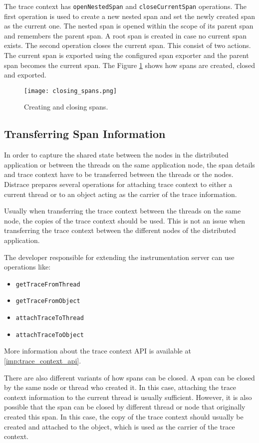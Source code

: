 The trace context has \texttt{openNestedSpan} and \texttt{closeCurrentSpan} operations. The first operation is used to create a new nested span and set the newly created span as the current one. The nested span is opened within the scope of its parent span and remembers the parent span. A root span is created in case no current span exists. The second operation closes the current span. This consist of two actions. The current span is exported using the configured span exporter and the parent span becomes the current span. The Figure \ref{fig:closing_spans} shows how spans are created, closed and exported. \begin{figure}
	\centering
	\texttt{[image: closing\_spans.png]}
	\caption{Creating and closing spans.}
	\label{fig:closing_spans}
\end{figure}

\subsection{Transferring Span Information}
In order to capture the shared state between the nodes in the distributed application or between the threads on the same application node, the span details and trace context have to be transferred between the threads or the nodes. Distrace prepares several operations for attaching trace context to either a current thread or to an object acting as the carrier of the trace information.

Usually when transferring the trace context between the threads on the same node, the copies of the trace context should be used. This is not an issue when transferring the trace context between the different nodes of the distributed application.


The developer responsible for extending the instrumentation server can use operations like:
\begin{itemize}
	\item  \texttt{getTraceFromThread}
	\item \texttt{getTraceFromObject}
	\item \texttt{attachTraceToThread}
	\item \texttt{attachTraceToObject}
\end{itemize}
More information about the trace context API is available at \ref{imp:trace_context_api}.

There are also different variants of how spans can be closed. A span can be closed by the same node or thread who created it. In this case, attaching the trace context information to the current thread is usually sufficient. However, it is also possible that the span can be closed by different thread or node that originally created this span. In this case, the copy of the trace context should usually be created and attached to the object, which is used as the carrier of the trace context.
